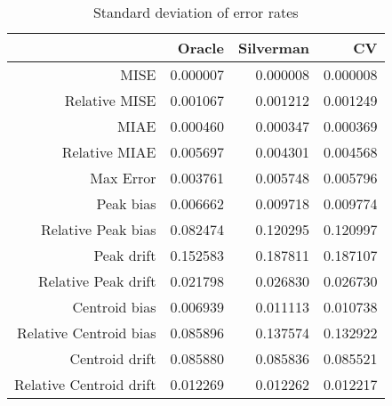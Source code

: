 \begin{table}[ht]
\centering
\begin{tabular}{rrrr}
  \hline
 & Oracle & Silverman & CV \\ 
  \hline
MISE & 0.000007 & 0.000008 & 0.000008 \\ 
  Relative MISE & 0.001067 & 0.001212 & 0.001249 \\ 
  MIAE & 0.000460 & 0.000347 & 0.000369 \\ 
  Relative MIAE & 0.005697 & 0.004301 & 0.004568 \\ 
  Max Error & 0.003761 & 0.005748 & 0.005796 \\ 
  Peak bias & 0.006662 & 0.009718 & 0.009774 \\ 
  Relative Peak bias & 0.082474 & 0.120295 & 0.120997 \\ 
  Peak drift & 0.152583 & 0.187811 & 0.187107 \\ 
  Relative Peak drift & 0.021798 & 0.026830 & 0.026730 \\ 
  Centroid bias & 0.006939 & 0.011113 & 0.010738 \\ 
  Relative Centroid bias & 0.085896 & 0.137574 & 0.132922 \\ 
  Centroid drift & 0.085880 & 0.085836 & 0.085521 \\ 
  Relative Centroid drift & 0.012269 & 0.012262 & 0.012217 \\ 
   \hline
\end{tabular}
\caption{Standard deviation of error rates} 
\label{tbl:stddev_error_rates}
\end{table}

